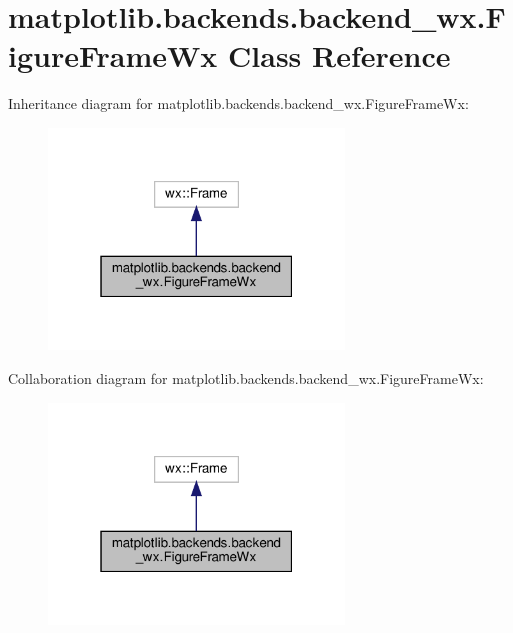 \hypertarget{classmatplotlib_1_1backends_1_1backend__wx_1_1FigureFrameWx}{}\section{matplotlib.\+backends.\+backend\+\_\+wx.\+Figure\+Frame\+Wx Class Reference}
\label{classmatplotlib_1_1backends_1_1backend__wx_1_1FigureFrameWx}


Inheritance diagram for matplotlib.\+backends.\+backend\+\_\+wx.\+Figure\+Frame\+Wx\+:
\nopagebreak
\begin{figure}[H]
\begin{center}
\leavevmode
\includegraphics[width=223pt]{classmatplotlib_1_1backends_1_1backend__wx_1_1FigureFrameWx__inherit__graph}
\end{center}
\end{figure}


Collaboration diagram for matplotlib.\+backends.\+backend\+\_\+wx.\+Figure\+Frame\+Wx\+:
\nopagebreak
\begin{figure}[H]
\begin{center}
\leavevmode
\includegraphics[width=223pt]{classmatplotlib_1_1backends_1_1backend__wx_1_1FigureFrameWx__coll__graph}
\end{center}
\end{figure}
